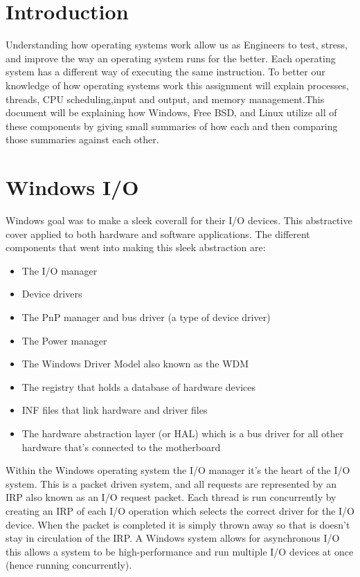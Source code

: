 \documentclass[onecolumn, draftclsnofoot,10pt, compsoc]{IEEEtran}
\begin{document}
\section{Introduction}
Understanding how operating systems work allow us as Engineers to test, stress, and improve the way an operating system runs for the better. Each operating system has a different way of executing the same instruction. To better our knowledge of how operating systems work this assignment will explain processes, threads, CPU scheduling,input and output, and memory management.This document will be explaining how Windows, Free BSD, and Linux utilize all of these components by giving small summaries of how each and then comparing those summaries against each other. 


\section{Windows I/O}
Windows goal was to make a sleek coverall for their I/O devices. This abstractive cover applied to both hardware and software applications. The different components that went into making this sleek abstraction are\cite{2}:
\begin{itemize}
  \item The I/O manager
  \item Device drivers 
  \item The PnP manager and bus driver (a type of device driver) 
  \item The Power manager 
  \item The Windows Driver Model also known as the WDM
  \item The registry that holds a database of hardware devices
  \item INF files that link hardware and driver files 
  \item The hardware abstraction layer (or HAL) which is a bus driver for all other hardware that's connected to the motherboard 
\end{itemize}
Within the Windows operating system the I/O manager it's the heart of the I/O system. This is a packet driven system, and all requests are represented by an IRP also known as an I/O request packet. Each thread\cite{1} is run concurrently by creating an IRP of each I/O operation which selects the correct driver for the I/O device. When the packet is completed it is simply thrown away so that is doesn't stay in circulation of the IRP. A Windows system allows for asynchronous I/O this allows a system to be high-performance and run multiple I/O devices at once (hence running concurrently)\cite{3}.
\end{document}

